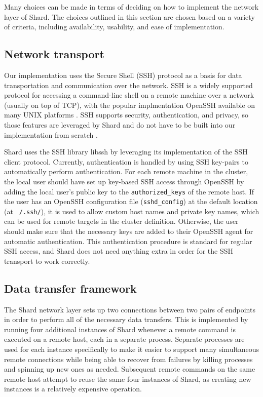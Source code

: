 \documentclass[twoside]{report}
\begin{document}
Many choices can be made in terms of deciding on how to implement the network layer of Shard.
The choices outlined in this section are chosen based on a variety of criteria, including availability, usability, and ease of implementation.

\subsection{Network transport}
Our implementation uses the Secure Shell (SSH) protocol as a basis for data transportation and communication over the network.
SSH is a widely supported protocol for accessing a command-line shell on a remote machine over a network (usually on top of TCP), with the popular implmentation OpenSSH available on many UNIX platforms \cite{openssh}.
SSH supports security, authentication, and privacy, so those features are leveraged by Shard and do not have to be built into our implementation from scratch \cite{rfc4251}.

Shard uses the SSH library libssh by leveraging its implementation of the SSH client protocol.
Currently, authentication is handled by using SSH key-pairs to automatically perform authentication.
For each remote machine in the cluster, the local user should have set up key-based SSH access through OpenSSH by adding the local user's public key to the \texttt{authorized\_keys} of the remote host.
If the user has an OpenSSH configuration file (\texttt{sshd\_config}) at the default location (at \texttt{~/.ssh/}), it is used to allow custom host names and private key names, which can be used for remote targets in the cluster definition.
Otherwise, the user should make sure that the necessary keys are added to their OpenSSH agent for automatic authentication.
This authentication procedure is standard for regular SSH access, and Shard does not need anything extra in order for the SSH transport to work correctly.

\subsection{Data transfer framework}

The Shard network layer sets up two connections between two pairs of endpoints in order to perform all of the necessary data transfers.
This is implemented by running four additional instances of Shard whenever a remote command is executed on a remote host, each in a separate process.
Separate processes are used for each instance specifically to make it easier to support many simultaneous remote connections while being able to recover from failures by killing processes and spinning up new ones as needed.
Subsequent remote commands on the same remote host attempt to reuse the same four instances of Shard, as creating new instances is a relatively expensive operation.
\end{document}
